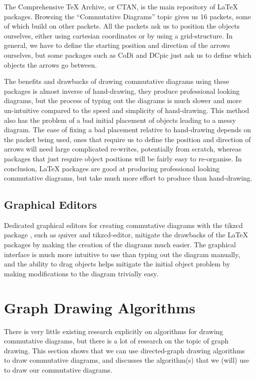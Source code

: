 \documentclass[logo,bsc,singlespacing,parskip]{infthesis}
\theoremstyle{definition}
\begin{document}
The Comprehensive \TeX{} Archive, or CTAN, is the main repository of \LaTeX{} packages. Browsing the ``Commutative Diagrams'' topic \cite{ctancommdiag} gives us 16 packets, some of which build on other packets. All the packets ask us to position the objects ourselves, either using cartesian coordinates or by using a grid-structure. %
In general, we have to define the starting position and direction of the arrows ourselves, but some packages such as CoDi \cite{Brasolin_2023} and DCpic \cite{Quaresma_2013} just ask us to define which objects the arrows go between.

The benefits and drawbacks of drawing commutative diagrams using these packages is almost inverse of hand-drawing, they produce professional looking diagrams, but the process of typing out the diagrams is much slower and more un-intuitive compared to the speed and simplicity of hand-drawing. This method also has the problem of a bad initial placement of objects leading to a messy diagram. The ease of fixing a bad placement relative to hand-drawing depends on the packet being used, ones that require us to define the position and direction of arrows will need large complicated re-writes, potentially from scratch, whereas packages that just require object positions will be fairly easy to re-organise. In conclusion, \LaTeX{} packages are good at producing professional looking commutative diagrams, but take much more effort to produce than hand-drawing.

\subsection{Graphical Editors}
Dedicated graphical editors for creating commutative diagrams with the tikzcd package \cite{Stoffel_2021}, such as quiver \cite{Arkor_quiver_2023} and tikzcd-editor, \cite{shen_tikzcd-editor_2023} mitigate the drawbacks of the \LaTeX{} packages by making the creation of the diagrams much easier. The graphical interface is much more intuitive to use than typing out the diagram manually, and the ability to drag objects helps mitigate the initial object problem by making modifications to the diagram trivially easy. 

\section{Graph Drawing Algorithms}\label{bkg:graph-draw}
There is very little existing research explicitly on algorithms for drawing commutative diagrams, but there is a lot of research on the topic of graph drawing. This section shows that we can use directed-graph drawing algorithms to draw commutative diagrams, and discusses the algorithm(s) that we (will) use to draw our commutative diagrams.
\end{document}

